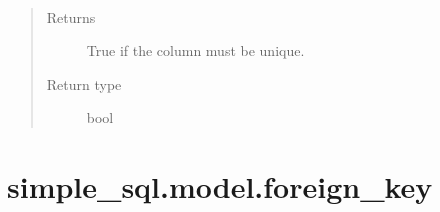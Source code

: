 \documentclass[letterpaper,10pt,english]{sphinxmanual}
\begin{document}
\begin{fulllineitems}
\begin{fulllineitems}
\end{fulllineitems}


\begin{fulllineitems}
\label{\detokenize{model:mini_sql.model.column.Column.is_unique}}~\begin{quote}\begin{description}
\item[{Returns}] \leavevmode
\sphinxAtStartPar
True if the column must be unique.

\item[{Return type}] \leavevmode
\sphinxAtStartPar
bool

\end{description}\end{quote}

\end{fulllineitems}


\end{fulllineitems}



\section{simple\_sql.model.foreign\_key}
\label{\detokenize{model:simple-sql-model-foreign-key}}
\end{document}
